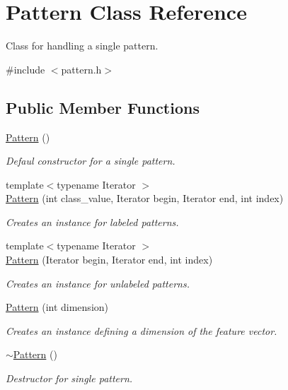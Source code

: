 \hypertarget{classPattern}{\section{Pattern Class Reference}
\label{classPattern}
}


Class for handling a single pattern.  




{\ttfamily \#include $<$pattern.\+h$>$}

\subsection*{Public Member Functions}
\begin{DoxyCompactItemize}
\item 
\hyperlink{classPattern_a95f42b0f1717d9e6c2d831e87d27f83c}{Pattern} ()
\begin{DoxyCompactList}\small\item\em Defaul constructor for a single pattern. \end{DoxyCompactList}\item 
{\footnotesize template$<$typename Iterator $>$ }\\\hyperlink{classPattern_a3cf22799a811394bab7fd167727a16af}{Pattern} (int class\+\_\+value, Iterator begin, Iterator end, int index)
\begin{DoxyCompactList}\small\item\em Creates an instance for labeled patterns. \end{DoxyCompactList}\item 
{\footnotesize template$<$typename Iterator $>$ }\\\hyperlink{classPattern_a87dcb126d751b5520a710dbf3e4eb7c0}{Pattern} (Iterator begin, Iterator end, int index)
\begin{DoxyCompactList}\small\item\em Creates an instance for unlabeled patterns. \end{DoxyCompactList}\item 
\hyperlink{classPattern_a3a1bf7ddd196fac02018c9cde4c421cf}{Pattern} (int dimension)
\begin{DoxyCompactList}\small\item\em Creates an instance defining a dimension of the feature vector. \end{DoxyCompactList}\item 
\hyperlink{classPattern_a6e8b9388bbd39934e9f9534b974d7498}{$\sim$\+Pattern} ()
\begin{DoxyCompactList}\small\item\em Destructor for single pattern. \end{DoxyCompactList}\item 

\end{DoxyCompactItemize}
